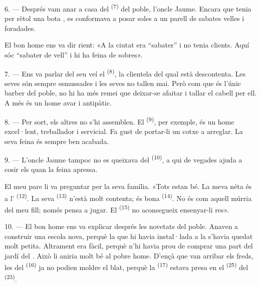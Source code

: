6. --- Després vam anar a casa del  \textsuperscript{(7)} del poble, l'oncle
Jaume. Encara que tenia per rètol una bota , es conformava a posar soles a
un parell de sabates velles i foradades.

El bon home ens va dir rient: «A la ciutat era “sabater” i no tenia clients. Aquí sóc “sabater
de vell” i hi ha feina de sobres».

7. --- Ens va parlar del seu veí el  \textsuperscript{(8)}, la clientela del
qual està descontenta. Les seves  són sempre esmussades i les seves
 no tallen mai. Però com que és l'únic barber del poble, no hi ha més remei
que deixar-se afaitar i tallar el cabell per ell. A més és un home avar i antipàtic.

8. --- Per sort, els altres  no s'hi assemblen. El 
\textsuperscript{(9)}, per exemple, és un home excel·lent, treballador i servicial. Fa gust de
portar-li un cotxe a arreglar. La seva feina és sempre ben acabada.

9. --- L'oncle Jaume tampoc no es queixava del  \textsuperscript{(10)}, a qui
de vegades ajuda a cosir els  quan la feina apressa.

El meu pare li va preguntar per la seva família. «Tots estan bé. La meva néta és a
l' \textsuperscript{(12)}. La seva  \textsuperscript{(13)}
n'està molt contenta; és bona  \textsuperscript{(14)}. No és com aquell múrria
del meu fill; només pensa a jugar. El  \textsuperscript{(15)} no aconsegueix
ensenyar-li res».

\VUsaut{3.0mm}
\VUsaut{3.0mm}

10. --- El bon home ens va explicar després les novetats del poble. Anaven a construir una
escola nova, perquè la que hi havia instal·lada a la  s'havia quedat
molt petita. Altrament era fàcil, perquè n'hi havia prou de comprar una part del jardí del
. Això li aniria molt bé al pobre home. D'ençà que van arribar els freds, les
 del  \textsuperscript{(16)} ja no podien moldre el blat, perquè la
 \textsuperscript{(17)} estava presa en el  \textsuperscript{(25)}
del
 \textsuperscript{(23)}.

